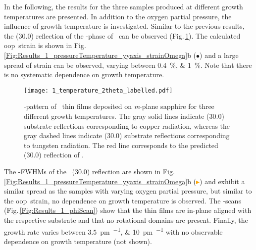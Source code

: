 In the following, the results for the three samples produced at different growth temperatures are presented.
In addition to the oxygen partial pressure, the influence of growth temperature is investigated.  
Similar to the previous results, the (30.0) reflection of the \textalpha-phase of \cro\ can be observed (Fig.\,\ref{Fig:Results_1_temperature_2theta}).
The calculated \gls{oop}\ strain is shown in Fig.\,\ref{Fig:Results_1_pressureTemperature_yyaxis_strainOmega}b ($\bullet$) and a large spread of strain can be observed, varying between \qtylist{0.4;1}{\percent}.
Note that there is no systematic dependence on growth temperature.
\begin{figure}
    \centering
    \texttt{[image: 1\_temperature\_2theta\_labelled.pdf]}
    \caption{
        \thetaomega-pattern of \cro\ thin films deposited on \textit{m}-plane sapphire for three different growth temperatures.
        The gray solid lines indicate (30.0) substrate reflections corresponding to copper radiation, whereas the gray dashed lines indicate (30.0) substrate reflections corresponding to tungsten radiation.
        The red line corresponds to the predicted (30.0) reflection of \cro.
    }
    \label{Fig:Results_1_temperature_2theta}
\end{figure}
The \textomega-FWHMs of the \cro\ (30.0) reflection are shown in Fig.\,\ref{Fig:Results_1_pressureTemperature_yyaxis_strainOmega}b (\textcolor{orange}{$\blacktriangleright$}) and exhibit a similar spread as the samples with varying oxygen partial pressure, but similar to the \gls{oop}\ strain, no dependence on growth temperature is observed.
The \textphi-scans (Fig.\,\ref{Fig:Results_1_phiScan}) show that the thin films are in-plane aligned with the respective substrate and that no rotational domains are present.
Finally, the growth rate varies between \qtylist{3.5;10}{\pm\per\pulse} with no observable dependence on growth temperature (not shown).